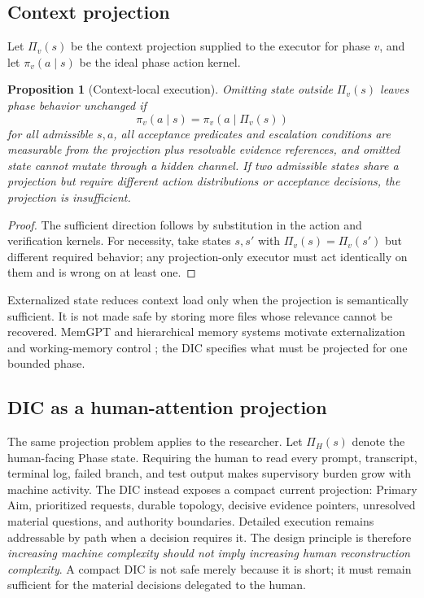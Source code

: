 \documentclass[11pt,a4paper]{article}
\newtheorem{proposition}[definition]{Proposition}
\begin{document}
\subsection{Context projection}
Let $\Pi_v(s)$ be the context projection supplied to the executor for phase $v$, and let $\pi_v(a\mid s)$ be the ideal phase action kernel.
\begin{proposition}[Context-local execution]
\label{prop:context}
Omitting state outside $\Pi_v(s)$ leaves phase behavior unchanged if
\[
\pi_v(a\mid s)=\pi_v(a\mid \Pi_v(s))
\]
for all admissible $s,a$, all acceptance predicates and escalation conditions are measurable from the projection plus resolvable evidence references, and omitted state cannot mutate through a hidden channel. If two admissible states share a projection but require different action distributions or acceptance decisions, the projection is insufficient.
\end{proposition}
\begin{proof}
The sufficient direction follows by substitution in the action and verification kernels. For necessity, take states $s,s'$ with $\Pi_v(s)=\Pi_v(s')$ but different required behavior; any projection-only executor must act identically on them and is wrong on at least one.
\end{proof}
Externalized state reduces context load only when the projection is semantically sufficient. It is not made safe by storing more files whose relevance cannot be recovered. MemGPT and hierarchical memory systems motivate externalization and working-memory control \cite{packer2023memgpt,wang2024hiagent}; the DIC specifies what must be projected for one bounded phase.

\subsection{DIC as a human-attention projection}
The same projection problem applies to the researcher. Let $\Pi_H(s)$ denote the human-facing Phase state. Requiring the human to read every prompt, transcript, terminal log, failed branch, and test output makes supervisory burden grow with machine activity. The DIC instead exposes a compact current projection: Primary Aim, prioritized requests, durable topology, decisive evidence pointers, unresolved material questions, and authority boundaries. Detailed execution remains addressable by path when a decision requires it. The design principle is therefore \emph{increasing machine complexity should not imply increasing human reconstruction complexity}. A compact DIC is not safe merely because it is short; it must remain sufficient for the material decisions delegated to the human.
\end{document}
